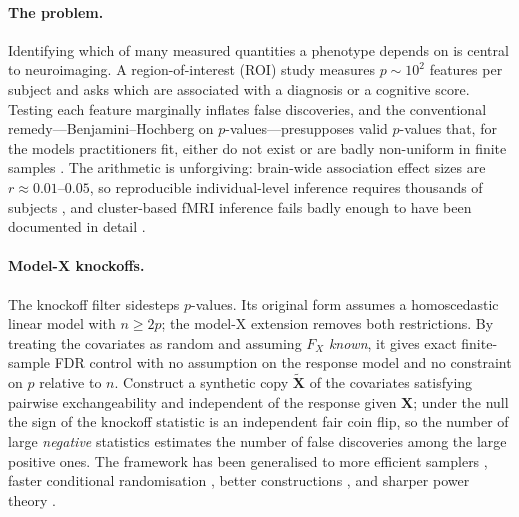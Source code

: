 \documentclass[11pt,a4paper]{article}
\newcommand{\X}{\mathbf{X}}
\newcommand{\Xt}{\tilde{\mathbf{X}}}
\begin{document}
\paragraph{The problem.}
Identifying which of many measured quantities a phenotype depends on is
central to neuroimaging. A region-of-interest (ROI) study measures $p\sim
10^2$ features per subject and asks which are associated with a diagnosis or
a cognitive score. Testing each feature marginally inflates false
discoveries, and the conventional remedy---Benjamini--Hochberg on
$p$-values---presupposes valid $p$-values that, for the models practitioners
fit, either do not exist or are badly non-uniform in finite samples
\citep{dezeure2015high}. The arithmetic is unforgiving: brain-wide
association effect sizes are $r\approx0.01$--$0.05$, so reproducible
individual-level inference requires thousands of subjects
\citep{marek2022reproducible}, and cluster-based fMRI inference fails badly
enough to have been documented in detail \citep{eklund2016cluster}.

\paragraph{Model-X knockoffs.}
The knockoff filter \citep{barber2015controlling} sidesteps $p$-values.
Its original form assumes a homoscedastic linear model with $n\ge2p$; the
model-X extension \citep{candes2018panning} removes both restrictions. By
treating the covariates as random and assuming $F_X$ \emph{known}, it gives
exact finite-sample FDR control with no assumption on the response model and
no constraint on $p$ relative to $n$. Construct a synthetic copy $\Xt$ of
the covariates satisfying pairwise exchangeability and independent of the
response given $\X$; under the null the sign of the knockoff statistic is an
independent fair coin flip, so the number of large \emph{negative}
statistics estimates the number of false discoveries among the large
positive ones. The framework has been generalised to more efficient samplers
\citep{bates2021metropolized}, faster conditional randomisation
\citep{liu2022fast}, better constructions \citep{spector2022powerful}, and
sharper power theory \citep{wang2022power,liu2019esd,ke2024power}.
\end{document}
